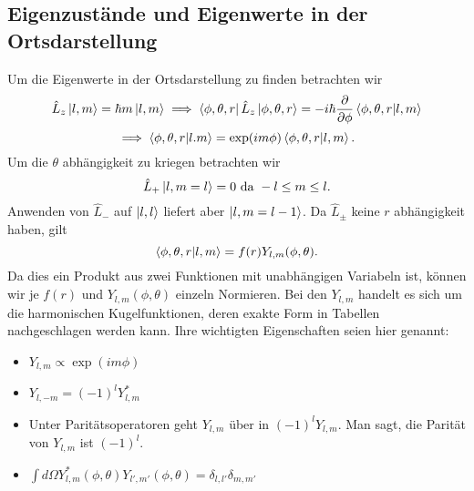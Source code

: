 \documentclass{report}
\begin{document}
\subsection{Eigenzustände und Eigenwerte in der Ortsdarstellung}
Um die Eigenwerte in der Ortsdarstellung zu finden betrachten wir \[
\hat{L}_z \ket{l,m} = \hbar m \ket{l,m} \implies \bra{\phi, \theta, r} \hat{L}_z\ket{\phi, \theta, r} = -i\hbar \frac{\partial}{\partial \phi} \bra{\phi, \theta, r} \ket{l,m} 	
\] \[
\implies \bra{\phi,\theta,r} \ket{l.m} = \exp(im\phi) \bra{\phi,\theta,r} \ket{l,m} 
.\]  
Um die $\theta$ abhängigkeit zu kriegen betrachten wir \[
\hat{L}_+ \ket{l,m=l} = 0 \text{ da } -l \le  m \le l
.\] Anwenden von $\hat{L}_-$ auf $\ket{l,l} $ liefert aber $\ket{l,m=l-1} $. Da $\hat{L}_{\pm}$ keine $r$ abhängigkeit haben, gilt \[
\bra{\phi, \theta, r} \ket{l,m} = f(r) Y_{l,m}(\phi,\theta)
.\] Da dies ein Produkt aus zwei Funktionen mit unabhängigen Variabeln ist, können wir je $f(r)$ und $Y_{l,m}(\phi, \theta)$ einzeln Normieren. Bei den $Y_{l,m}$ handelt es sich um die harmonischen Kugelfunktionen, deren exakte Form in Tabellen nachgeschlagen werden kann. Ihre wichtigten Eigenschaften seien hier genannt: 
\begin{itemize}
	\item $Y_{l,m} \propto \exp(im\phi)$
	\item $Y_{l,-m} = \left( -1 \right) ^l Y_{l,m}^*$ 
	\item Unter Paritätsoperatoren geht $Y_{l,m}$ über in $\left( -1 \right) ^l Y_{l,m}$. Man sagt, die Parität von $Y_{l,m}$ ist $\left( -1 \right) ^l$.
	\item $\int d\Omega Y_{l,m}^*(\phi, \theta) Y_{l',m'}(\phi, \theta) = \delta_{l,l'}\delta_{m,m'}$
\end{itemize}
\end{document}
